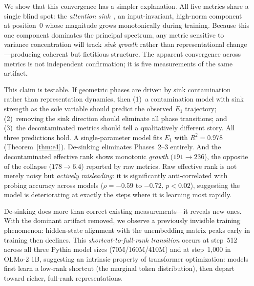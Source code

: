 \documentclass[11pt]{article}
\begin{document}
We show that this convergence has a simpler explanation.
All five metrics share a single blind spot: the \emph{attention sink}~\citep{xiao2024efficient}, an input-invariant, high-norm component at position~0 whose magnitude grows monotonically during training.
Because this one component dominates the principal spectrum, any metric sensitive to variance concentration will track \emph{sink growth} rather than representational change---producing coherent but fictitious structure.
The apparent convergence across metrics is not independent confirmation; it is five measurements of the same artifact.

This claim is testable.
If geometric phases are driven by sink contamination rather than representation dynamics, then (1)~a contamination model with sink strength as the sole variable should predict the observed $E_1$ trajectory; (2)~removing the sink direction should eliminate all phase transitions; and (3)~the decontaminated metrics should tell a qualitatively different story.
All three predictions hold.
A single-parameter model fits $E_1$ with $R^2 = 0.978$ (Theorem~\ref{thm:e1}).
De-sinking eliminates Phases~2--3 entirely.
And the decontaminated effective rank shows monotonic \emph{growth} ($191 \to 236$), the opposite of the collapse ($178 \to 6.4$) reported by raw metrics.
Raw effective rank is not merely noisy but \emph{actively misleading}: it is significantly anti-correlated with probing accuracy across models ($\rho = -0.59$ to $-0.72$, $p < 0.02$), suggesting the model is deteriorating at exactly the steps where it is learning most rapidly.

De-sinking does more than correct existing measurements---it reveals new ones.
With the dominant artifact removed, we observe a previously invisible training phenomenon: hidden-state alignment with the unembedding matrix peaks early in training then declines.
This \emph{shortcut-to-full-rank transition} occurs at step~512 across all three Pythia model sizes (70M/160M/410M) and at step~1{,}000 in OLMo-2 1B, suggesting an intrinsic property of transformer optimization: models first learn a low-rank shortcut (the marginal token distribution), then depart toward richer, full-rank representations.
\end{document}
